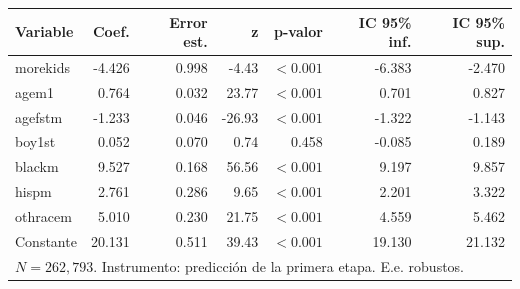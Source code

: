 
\begin{tabular}{lrrrrrr}
\toprule
Variable & Coef. & Error est. & z & p-valor & IC 95\% inf. & IC 95\% sup.\\
\midrule
morekids & -4.426 & 0.998 & -4.43 & $<0.001$ & -6.383 & -2.470\\
agem1 & 0.764 & 0.032 & 23.77 & $<0.001$ & 0.701 & 0.827\\
agefstm & -1.233 & 0.046 & -26.93 & $<0.001$ & -1.322 & -1.143\\
boy1st & 0.052 & 0.070 & 0.74 & 0.458 & -0.085 & 0.189\\
blackm & 9.527 & 0.168 & 56.56 & $<0.001$ & 9.197 & 9.857\\
hispm & 2.761 & 0.286 & 9.65 & $<0.001$ & 2.201 & 3.322\\
othracem & 5.010 & 0.230 & 21.75 & $<0.001$ & 4.559 & 5.462\\
Constante & 20.131 & 0.511 & 39.43 & $<0.001$ & 19.130 & 21.132\\
\midrule
\multicolumn{7}{l}{$N=262{,}793$. Instrumento: predicción de la primera etapa. E.e. robustos.}\\
\bottomrule
\end{tabular}
